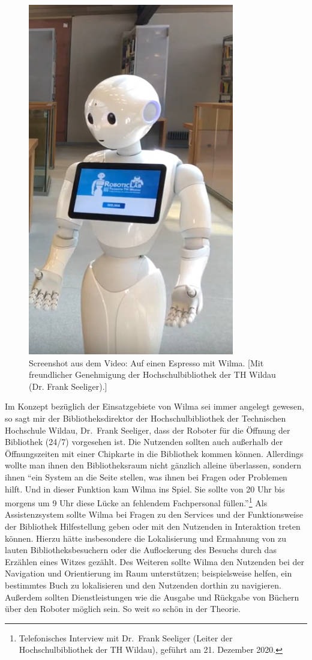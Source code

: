 \documentclass[a4paper,
fontsize=11pt,
oneside,
numbers=noperiodatend,
parskip=half-,
bibliography=totoc,
final
]{scrartcl}
\begin{document}
\begin{figure}
\centering
\includegraphics{img/Wilma.PNG}
\caption{Screenshot aus dem Video: Auf einen Espresso mit Wilma. {[}Mit freundlicher Genehmigung der Hochschulbibliothek der TH Wildau (Dr. Frank Seeliger).{]}}
\end{figure}

Im Konzept bezüglich der Einsatzgebiete von Wilma sei immer angelegt
gewesen, so sagt mir der Bibliotheksdirektor der Hochschulbibliothek der
Technischen Hochschule Wildau, Dr.~Frank Seeliger, dass der Roboter für
die Öffnung der Bibliothek (24/7) vorgesehen ist. Die Nutzenden sollten
auch außerhalb der Öffnungszeiten mit einer Chipkarte in die Bibliothek
kommen können. Allerdings wollte man ihnen den Bibliotheksraum nicht
gänzlich alleine überlassen, sondern ihnen \enquote{ein System an die
Seite stellen, was ihnen bei Fragen oder Problemen hilft. Und in dieser
Funktion kam Wilma ins Spiel. Sie sollte von 20 Uhr bis morgens um 9 Uhr
diese Lücke an fehlendem Fachpersonal füllen.}\footnote{Telefonisches
  Interview mit Dr.~Frank Seeliger (Leiter der Hochschulbibliothek der
  TH Wildau), geführt am 21. Dezember 2020.} Als Assistenzsystem sollte
Wilma bei Fragen zu den Services und der Funktionsweise der Bibliothek
Hilfestellung geben oder mit den Nutzenden in Interaktion treten können.
Hierzu hätte insbesondere die Lokalisierung und Ermahnung von zu lauten
Bibliotheksbesuchern oder die Auflockerung des Besuchs durch das
Erzählen eines Witzes gezählt. Des Weiteren sollte Wilma den Nutzenden
bei der Navigation und Orientierung im Raum unterstützen; beispielsweise
helfen, ein bestimmtes Buch zu lokalisieren und den Nutzenden dorthin zu
navigieren. Außerdem sollten Dienstleistungen wie die Ausgabe und
Rückgabe von Büchern über den Roboter möglich sein. So weit so schön in
der Theorie.
\end{document}
